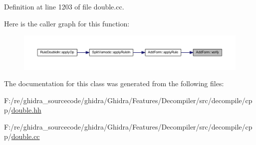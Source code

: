 Definition at line 1203 of file double.\+cc.

Here is the caller graph for this function\+:
\nopagebreak
\begin{figure}[H]
\begin{center}
\leavevmode
\includegraphics[width=350pt]{class_add_form_a8209972b6d883948177d25dd9c4d9268_icgraph}
\end{center}
\end{figure}


The documentation for this class was generated from the following files\+:\begin{DoxyCompactItemize}
\item 
F\+:/re/ghidra\+\_\+sourcecode/ghidra/\+Ghidra/\+Features/\+Decompiler/src/decompile/cpp/\mbox{\hyperlink{double_8hh}{double.\+hh}}\item 
F\+:/re/ghidra\+\_\+sourcecode/ghidra/\+Ghidra/\+Features/\+Decompiler/src/decompile/cpp/\mbox{\hyperlink{double_8cc}{double.\+cc}}\end{DoxyCompactItemize}

